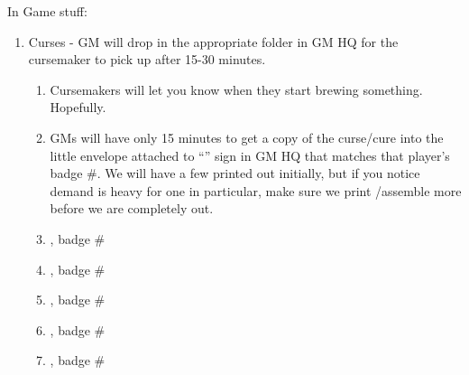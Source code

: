 \documentclass[green]{GL2020}
\begin{document}
{\large In Game stuff:}
\begin{enumerate}
	\item Curses - GM will drop in the appropriate folder in GM HQ for the cursemaker to pick up after 15-30 minutes.
	\begin{enumerate}
		\item Cursemakers will let you know when they start brewing something. Hopefully.
		\item GMs will have only 15 minutes to get a copy of the curse/cure into the little envelope attached to ``\sCurses{}'' sign in GM HQ that matches that player’s badge #. We will have a few printed out initially, but if you notice demand is heavy for one in particular, make sure we print /assemble more before we are completely out.
		\item \cCurse{\full}, badge # \cCurse{\MYnumber{}}
		\item \cPrince{\full}, badge # \cPrince{\MYnumber{}}
		\item \cAdopted{\full}, badge # \cAdopted{\MYnumber{}}
		\item \cLibAssist{\full}, badge # \cLibAssist{\MYnumber{}}
		\item \cHeir{\full}, badge # \cHeir{\MYnumber{}}


\end{enumerate}
\end{enumerate}
\end{document}
